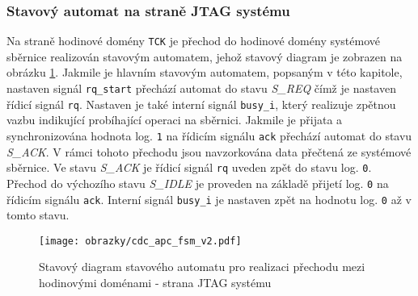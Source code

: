 \subsubsection{Stavový automat na straně \acs{JTAG} systému}
Na straně hodinové domény \texttt{\acs{TCK}} je přechod do hodinové domény systémové sběrnice realizován stavovým automatem, jehož stavový diagram je zobrazen na obrázku \ref{fig:cdc_apc_fsm}. Jakmile je hlavním stavovým automatem, popsaným v této kapitole, nastaven signál \texttt{rq\_start} přechází automat do stavu \textit{S\_REQ} čímž je nastaven řídicí signál \texttt{rq}. Nastaven je také interní signál \texttt{busy\_i}, který realizuje zpětnou vazbu indikující probíhající operaci na sběrnici. Jakmile je přijata a synchronizována hodnota log. \texttt{1} na řídicím signálu \texttt{ack} přechází automat do stavu \textit{S\_ACK}. V rámci tohoto přechodu jsou navzorkována data přečtená ze systémové sběrnice. Ve stavu \textit{S\_ACK} je řídicí signál \texttt{rq} uveden zpět do stavu log. \texttt{0}. Přechod do výchozího stavu \textit{S\_IDLE} je proveden na základě přijetí log. \texttt{0} na řídicím signálu \texttt{ack}. Interní signál \texttt{busy\_i} je nastaven zpět na hodnotu log. \texttt{0} až v tomto stavu.

\begin{figure}[H]
  \begin{center}
    \texttt{[image: obrazky/cdc\_apc\_fsm\_v2.pdf]}
  \end{center}
  \caption{Stavový diagram stavového automatu pro realizaci přechodu mezi hodinovými doménami - strana \acs{JTAG} systému}
	\label{fig:cdc_apc_fsm}
\end{figure}

